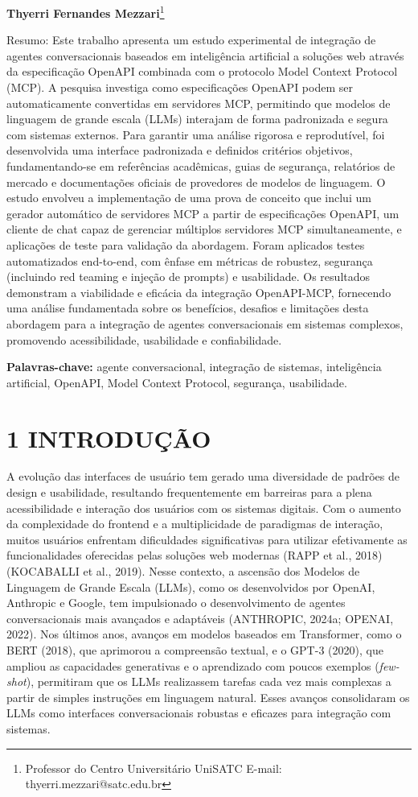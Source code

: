 \documentclass[
]{article}
\begin{document}
\textbf{Thyerri Fernandes Mezzari}\footnote{Professor do Centro
  Universitário UniSATC E-mail: thyerri.mezzari@satc.edu.br}

Resumo: Este trabalho apresenta um estudo experimental de integração de
agentes conversacionais baseados em inteligência artificial a soluções
web através da especificação OpenAPI combinada com o protocolo Model
Context Protocol (MCP). A pesquisa investiga como especificações OpenAPI
podem ser automaticamente convertidas em servidores MCP, permitindo que
modelos de linguagem de grande escala (LLMs) interajam de forma
padronizada e segura com sistemas externos. Para garantir uma análise
rigorosa e reprodutível, foi desenvolvida uma interface padronizada e
definidos critérios objetivos, fundamentando-se em referências
acadêmicas, guias de segurança, relatórios de mercado e documentações
oficiais de provedores de modelos de linguagem. O estudo envolveu a
implementação de uma prova de conceito que inclui um gerador automático
de servidores MCP a partir de especificações OpenAPI, um cliente de chat
capaz de gerenciar múltiplos servidores MCP simultaneamente, e
aplicações de teste para validação da abordagem. Foram aplicados testes
automatizados end-to-end, com ênfase em métricas de robustez, segurança
(incluindo red teaming e injeção de prompts) e usabilidade. Os
resultados demonstram a viabilidade e eficácia da integração
OpenAPI-MCP, fornecendo uma análise fundamentada sobre os benefícios,
desafios e limitações desta abordagem para a integração de agentes
conversacionais em sistemas complexos, promovendo acessibilidade,
usabilidade e confiabilidade.

\textbf{Palavras-chave:} agente conversacional, integração de sistemas,
inteligência artificial, OpenAPI, Model Context Protocol, segurança,
usabilidade.

\section{1 INTRODUÇÃO}\label{introduuxe7uxe3o}

A evolução das interfaces de usuário tem gerado uma diversidade de
padrões de design e usabilidade, resultando frequentemente em barreiras
para a plena acessibilidade e interação dos usuários com os sistemas
digitais. Com o aumento da complexidade do frontend e a multiplicidade
de paradigmas de interação, muitos usuários enfrentam dificuldades
significativas para utilizar efetivamente as funcionalidades oferecidas
pelas soluções web modernas (RAPP et al., 2018) (KOCABALLI et al.,
2019). Nesse contexto, a ascensão dos Modelos de Linguagem de Grande
Escala (LLMs), como os desenvolvidos por OpenAI, Anthropic e Google, tem
impulsionado o desenvolvimento de agentes conversacionais mais avançados
e adaptáveis (ANTHROPIC, 2024a; OPENAI, 2022). Nos últimos anos, avanços
em modelos baseados em Transformer, como o BERT (2018), que aprimorou a
compreensão textual, e o GPT-3 (2020), que ampliou as capacidades
generativas e o aprendizado com poucos exemplos (\emph{few-shot}),
permitiram que os LLMs realizassem tarefas cada vez mais complexas a
partir de simples instruções em linguagem natural. Esses avanços
consolidaram os LLMs como interfaces conversacionais robustas e eficazes
para integração com sistemas.
\end{document}
